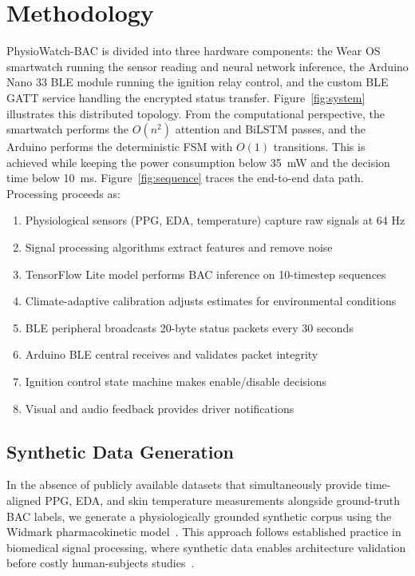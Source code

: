 \documentclass[HARVARD,Times2COL]{WileyNJDv5} %
\providecommand{\DIFadd}[1]{{\protect\color{red} #1}} %
\providecommand{\DIFaddbegin}{} %
\providecommand{\DIFdelend}{} %
\providecommand{\DIFaddincludegraphics}[2][]{{\color{blue}\fbox{\DIFOincludegraphics[#1]{#2}}}} %
\DeclareRobustCommand{\DIFaddbegin}{\DIFOaddbegin \let\includegraphics\DIFaddincludegraphics} %
\DeclareRobustCommand{\DIFdelend}{\DIFOaddend \let\includegraphics\DIFOincludegraphics} %
\begin{document}
\DIFdelend \section{Methodology}\label{sec2}
PhysioWatch-BAC is divided into three hardware components: the Wear OS smartwatch running the sensor reading and neural network inference, the Arduino Nano 33 BLE module running the ignition relay control, and the custom BLE GATT service handling the encrypted status transfer. Figure~\ref{fig:system} illustrates this distributed topology.
From the computational perspective, the smartwatch performs the $O(n^2)$ attention and BiLSTM passes, and the Arduino performs the deterministic FSM with $O(1)$ transitions. This is achieved while keeping the power consumption below 35~mW and the decision time below 10~ms. Figure~\ref{fig:sequence} traces the end-to-end data path. Processing proceeds as:
\begin{enumerate}
    \item Physiological sensors (PPG, EDA, temperature) capture raw signals at 64 Hz
    \item Signal processing algorithms extract features and remove noise
    \item TensorFlow Lite model performs BAC inference on 10-timestep sequences
    \item Climate-adaptive calibration adjusts estimates for environmental conditions
    \item BLE peripheral broadcasts 20-byte status packets every 30 seconds
    \item Arduino BLE central receives and validates packet integrity
    \item Ignition control state machine makes enable/disable decisions
    \item Visual and audio feedback provides driver notifications
\end{enumerate}
\DIFaddbegin \subsection{\DIFadd{Synthetic Data Generation}}\label{sec:synthetic}
\DIFadd{In the absence of publicly available datasets that simultaneously provide time-aligned PPG, EDA, and skin temperature measurements alongside ground-truth BAC labels, we generate a physiologically grounded synthetic corpus using the Widmark pharmacokinetic model~\citep{widmark1932}. This approach follows established practice in biomedical signal processing, where synthetic data enables architecture validation before costly human-subjects studies~\citep{reiss2019}.
}
\end{document}
